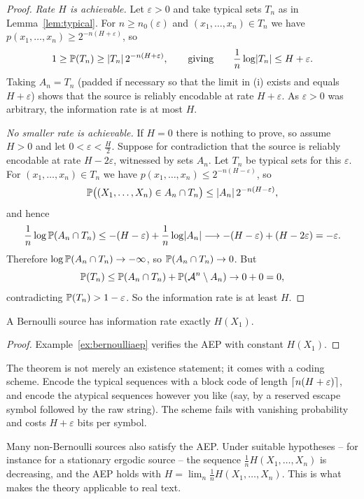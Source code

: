 \documentclass[a4paper]{scrartcl}
\DeclarePairedDelimiter{\ceil}{\lceil}{\rceil}
\newcommand{\Ac}{\mathcal{A}}
\begin{document}
\begin{proof}
	\emph{Rate $H$ is achievable.} Let $\varepsilon>0$ and take typical sets $T_n$ as in Lemma~\ref{lem:typical}. For $n \ge n_0(\varepsilon)$ and $(x_1,\dots,x_n) \in T_n$ we have $p(x_1,\dots,x_n) \ge 2^{-n(H+\varepsilon)}$, so
	$$1 \ge \mathbb{P}(T_n) \ge \lvert T_n\rvert\,2^{-n(H+\varepsilon)}, \qquad \text{giving} \qquad \frac1n \log\lvert T_n\rvert \le H+\varepsilon.$$
	Taking $A_n = T_n$ (padded if necessary so that the limit in (i) exists and equals $H + \varepsilon$) shows that the source is reliably encodable at rate $H+\varepsilon$. As $\varepsilon>0$ was arbitrary, the information rate is at most $H$.

	\emph{No smaller rate is achievable.} If $H=0$ there is nothing to prove, so assume $H>0$ and let $0 < \varepsilon < \tfrac{H}{2}$. Suppose for contradiction that the source is reliably encodable at rate $H-2\varepsilon$, witnessed by sets $A_n$. Let $T_n$ be typical sets for this $\varepsilon$. For $(x_1,\dots,x_n)\in T_n$ we have $p(x_1,\dots,x_n) \le 2^{-n(H-\varepsilon)}$, so
	$$\mathbb{P}\bigl((X_1,\dots,X_n) \in A_n \cap T_n\bigr) \le \lvert A_n\rvert\,2^{-n(H-\varepsilon)},$$
	and hence
	$$\frac1n\log \mathbb{P}(A_n \cap T_n) \le -(H-\varepsilon) + \frac1n\log\lvert A_n\rvert \longrightarrow -(H-\varepsilon)+(H-2\varepsilon) = -\varepsilon.$$
	Therefore $\log\mathbb{P}(A_n \cap T_n) \to -\infty$, so $\mathbb{P}(A_n \cap T_n) \to 0$. But
	$$\PP(T_n) \le \PP(A_n \cap T_n) + \PP(\Ac^n \setminus A_n) \to 0 + 0 = 0,$$
	contradicting $\mathbb{P}(T_n) > 1-\varepsilon$. So the information rate is at least $H$.
\end{proof}

\begin{corollary}
	A Bernoulli source has information rate exactly $H(X_1)$.
\end{corollary}

\begin{proof}
	Example~\ref{ex:bernoulliaep} verifies the AEP with constant $H(X_1)$.
\end{proof}

\begin{remark}
	The theorem is not merely an existence statement; it comes with a coding scheme. Encode the typical sequences with a block code of length $\ceil{n(H+\varepsilon)}$, and encode the atypical sequences however you like (say, by a reserved escape symbol followed by the raw string). The scheme fails with vanishing probability and costs $H+\varepsilon$ bits per symbol.

	Many non-Bernoulli sources also satisfy the AEP. Under suitable hypotheses -- for instance for a stationary ergodic source -- the sequence $\frac1n H(X_1,\dots,X_n)$ is decreasing, and the AEP holds with $H = \lim_n \frac1n H(X_1,\dots,X_n)$. This is what makes the theory applicable to real text.
\end{remark}
\end{document}
